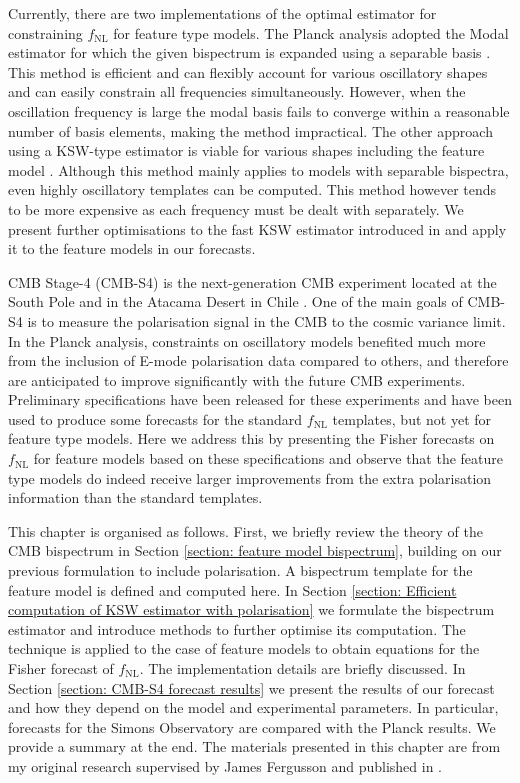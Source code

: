Currently, there are two implementations of the optimal estimator for constraining $f_\text{NL}$ for feature type models. The Planck analysis adopted the Modal estimator for which the given bispectrum is expanded using a separable basis \cite{Fergusson2012,Fergusson2014}. This method is efficient and can flexibly account for various oscillatory shapes and can easily constrain all frequencies simultaneously. However, when the oscillation frequency is large the modal basis fails to converge within a reasonable number of basis elements, making the method impractical. The other approach using a KSW-type estimator is viable for various shapes including the feature model \cite{Komatsu2005,Munchmeyer2014}. Although this method mainly applies to models with separable bispectra, even highly oscillatory templates can be computed.  This method however tends to be more expensive as each frequency must be dealt with separately. We present further optimisations to the fast KSW estimator introduced in \cite{Yadav2007} and apply it to the feature models in our forecasts.

CMB Stage-4 (CMB-S4) is the next-generation CMB experiment located at the South Pole and in the Atacama Desert in Chile \cite{Abazajian2016}. One of the main goals of CMB-S4 is to measure the polarisation signal in the CMB to the cosmic variance limit. In the Planck analysis, constraints on oscillatory models benefited much more from the inclusion of E-mode polarisation data compared to others, and therefore are anticipated to improve significantly with the future CMB experiments. Preliminary specifications have been released for these experiments \cite{Abazajian2016,TheSimonsObservatoryCollaboration2018} and have been used to produce some forecasts for the standard $f_\text{NL}$ templates, but not yet for feature type models. Here we address this by presenting the Fisher forecasts on $f_\text{NL}$ for feature models based on these specifications and observe that the feature type models do indeed receive larger improvements from the extra polarisation information than the standard templates.

This chapter is organised as follows. First, we briefly review the theory of the CMB bispectrum in Section \ref{section: feature model bispectrum}, building on our previous formulation to include polarisation. A bispectrum template for the feature model is defined and computed here. In Section \ref{section: Efficient computation of KSW estimator with polarisation} we formulate the bispectrum estimator and introduce methods to further optimise its computation. The technique is applied to the case of feature models to obtain equations for the Fisher forecast of $f_\text{NL}$. The implementation details are briefly discussed. In Section \ref{section: CMB-S4 forecast results} we present the results of our forecast and how they depend on the model and experimental parameters. In particular, forecasts for the Simons Observatory are compared with the Planck results. We provide a summary at the end. The materials presented in this chapter are from my original research supervised by James Fergusson and published in \cite{Sohn2019}.



